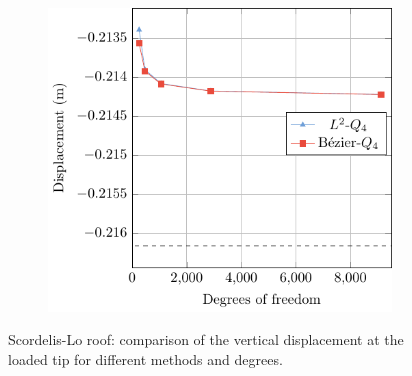 \documentclass[preprint,12pt]{elsarticle}
\theoremstyle{remark}
\begin{document}
\begin{figure}[!hbt]
\begin{subfigure}[b]{.32\textwidth}
        \caption{}
    \end{subfigure}
    \begin{subfigure}[b]{.32\textwidth}
        \centering
        \includegraphics[width = \textwidth]{L-beam-p=4}
        \caption{}
    \end{subfigure}
	\caption{Scordelis-Lo roof: comparison of the vertical displacement at the loaded tip for different methods and degrees.}\label{fig:L-beam-converge}
\end{figure}
\end{document}
